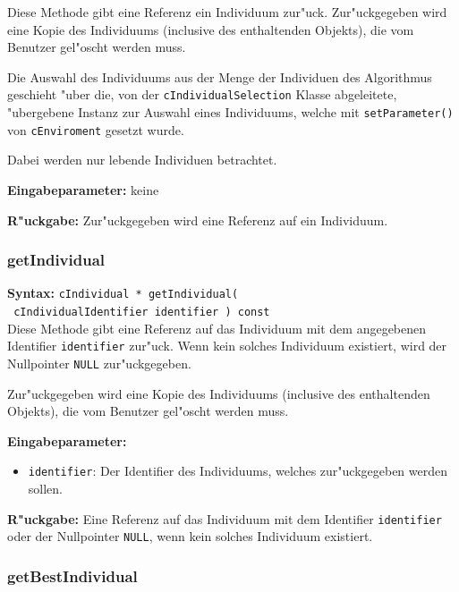 Diese Methode gibt eine Referenz ein Individuum zur"uck. Zur"uckgegeben wird eine Kopie des Individuums (inclusive des enthaltenden Objekts), die vom Benutzer gel"oscht werden muss.

Die Auswahl des Individuums aus der Menge der Individuen des Algorithmus geschieht "uber die, von der \verb|cIndividualSelection| Klasse abgeleitete, "ubergebene Instanz zur Auswahl eines Individuums, welche mit \verb|setParameter()| von \verb|cEnviroment| gesetzt wurde.

Dabei werden nur lebende Individuen betrachtet.

\bigskip\noindent
\textbf{Eingabeparameter:} keine

\bigskip\noindent
\textbf{R"uckgabe:} Zur"uckgegeben wird eine Referenz auf ein Individuum.


\subsubsection{getIndividual}

\textbf{Syntax:} \verb|cIndividual * getIndividual(| \\\verb| cIndividualIdentifier identifier ) const| \\

Diese Methode gibt eine Referenz auf das Individuum mit dem angegebenen Identifier \verb|identifier| zur"uck. Wenn kein solches Individuum existiert, wird der Nullpointer \verb|NULL| zur"uckgegeben.

Zur"uckgegeben wird eine Kopie des Individuums (inclusive des enthaltenden Objekts), die vom Benutzer gel"oscht werden muss.

\bigskip\noindent
\textbf{Eingabeparameter:}
\begin{itemize}
 \item \verb|identifier|: Der Identifier des Individuums, welches zur"uckgegeben werden sollen.
\end{itemize}

\bigskip\noindent
\textbf{R"uckgabe:} Eine Referenz auf das Individuum mit dem Identifier \verb|identifier| oder der Nullpointer \verb|NULL|, wenn kein solches Individuum existiert.



\subsubsection{getBestIndividual}

